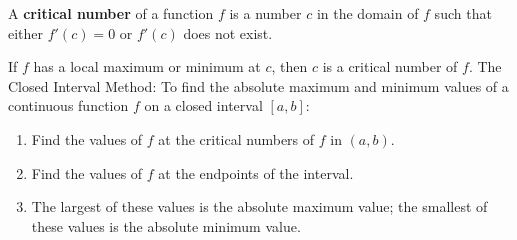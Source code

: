 \begin{definition}
    A \textbf{critical number} of a function \(f\) is a number \(c\) in the
    domain of \(f\) such that either \(f'(c)=0\) or \(f'(c)\) does not exist.
\end{definition}
If \(f\) has a local maximum or minimum at \(c\), then \(c\) is a critical
number of \(f\).
The Closed Interval Method: To find the absolute maximum and minimum values of
a continuous function \(f\) on a closed interval \([a,b]\):
\begin{enumerate}
    \item Find the values of \(f\) at the critical numbers of \(f\) in
    \((a,b)\).
    \item Find the values of \(f\) at the endpoints of the interval.
    \item The largest of these values is the absolute maximum value; the
    smallest of these values is the absolute minimum value.
\end{enumerate}